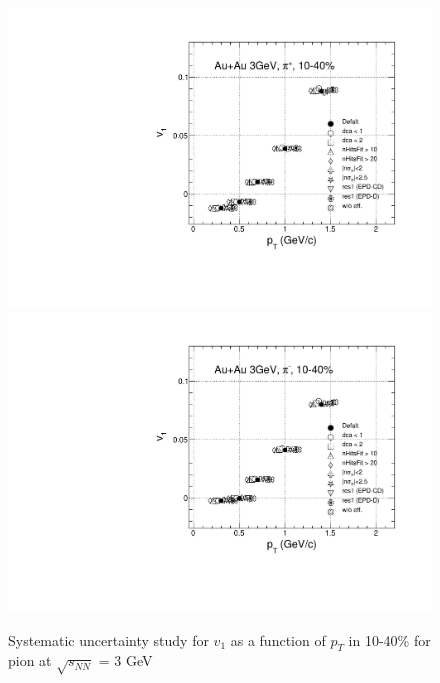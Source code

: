 \begin{figure}[h]
\includegraphics[scale=0.4]{chapter3/fig/sys/pion/v1pt_pip_sys.pdf}
\includegraphics[scale=0.4]{chapter3/fig/sys/pion/v1pt_pim_sys.pdf}
\caption{Systematic uncertainty study for $v_{1}$ as a function of $p_{T}$ in 10-40\% for pion at $\sqrt{s_{NN}}$ = 3 GeV}
\label{pion_v1y_sys}
\end{figure}

